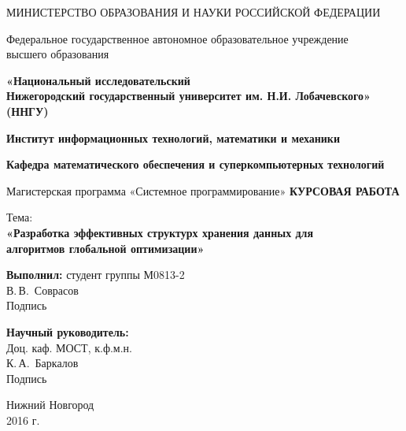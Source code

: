 \begin{titlepage}
\begin{center}
    МИНИСТЕРСТВО ОБРАЗОВАНИЯ И НАУКИ РОССИЙСКОЙ ФЕДЕРАЦИИ

    Федеральное государственное автономное образовательное учреждение\\
    высшего образования

    \textbf{«Национальный исследовательский\\Нижегородский государственный университет им. Н.И. Лобачевского»\\(ННГУ)}
    \vspace{1cm}

    \textbf{Институт информационных технологий, математики и механики}
    \vspace{0.5cm}

    \textbf{Кафедра математического обеспечения и суперкомпьютерных технологий}
    \vspace{0.75cm}

    Магистерская программа «Системное программирование»
    \vfill
    \textbf{\Large КУРСОВАЯ РАБОТА}
    \vspace{0.75cm}

    Тема:\\
    \textbf{\large «Разработка эффективных структурх хранения данных для\\ алгоритмов глобальной оптимизации»}
  \bigskip
\end{center}
\vfill

\hfill\begin{minipage}{0.5\textwidth}
    \textbf{Выполнил:} студент группы М0813-2\\
    \underline{\hspace{0.5\textwidth}} В.\,В.~Соврасов\\
    {\hspace*{1.5cm}\small Подпись}
\end{minipage}%
\bigskip

\hfill\begin{minipage}{0.5\textwidth}
    \textbf{Научный руководитель:}\\
    Доц. каф. МОСТ, к.ф.м.н.\\
    \underline{\hspace{0.5\textwidth}} К.\,А.~Баркалов\\
    {\hspace*{1.5cm}\small Подпись}
\end{minipage}%
\vfill

\begin{center}
    Нижний Новгород\\2016 г.
\end{center}
\end{titlepage}
